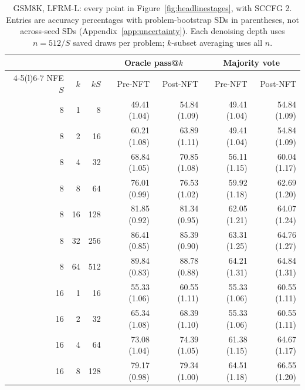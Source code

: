 \documentclass{article}
\begin{document}
\begin{table}[!htbp]
\caption{GSM8K, LFRM-L: every point in Figure~\ref{fig:headlinestages}, with SCCFG 2. Entries are accuracy percentages with problem-bootstrap SDs in parentheses, not across-seed SDs (Appendix~\ref{app:uncertainty}). Each denoising depth uses $n=512/S$ saved draws per problem; $k$-subset averaging uses all $n$.}
\label{tab:budgetvaluesgsml}
\centering\small
\setlength{\tabcolsep}{5pt}
\begin{tabular}{@{}rrr rrrr@{}}
\toprule
& & & \multicolumn{2}{c}{Oracle pass@$k$} & \multicolumn{2}{c}{Majority vote} \\
\cmidrule(lr){4-5}\cmidrule(l){6-7}
NFE $S$ & $k$ & $kS$ & Pre-NFT & Post-NFT & Pre-NFT & Post-NFT \\
\midrule
8 & 1 & 8 & 49.41 {\scriptsize (1.04)} & 54.84 {\scriptsize (1.09)} & 49.41 {\scriptsize (1.04)} & 54.84 {\scriptsize (1.09)} \\
8 & 2 & 16 & 60.21 {\scriptsize (1.08)} & 63.89 {\scriptsize (1.11)} & 49.41 {\scriptsize (1.04)} & 54.84 {\scriptsize (1.09)} \\
8 & 4 & 32 & 68.84 {\scriptsize (1.05)} & 70.85 {\scriptsize (1.08)} & 56.11 {\scriptsize (1.15)} & 60.04 {\scriptsize (1.17)} \\
8 & 8 & 64 & 76.01 {\scriptsize (0.99)} & 76.53 {\scriptsize (1.02)} & 59.92 {\scriptsize (1.18)} & 62.69 {\scriptsize (1.20)} \\
8 & 16 & 128 & 81.85 {\scriptsize (0.92)} & 81.34 {\scriptsize (0.95)} & 62.05 {\scriptsize (1.21)} & 64.07 {\scriptsize (1.24)} \\
8 & 32 & 256 & 86.41 {\scriptsize (0.85)} & 85.39 {\scriptsize (0.90)} & 63.31 {\scriptsize (1.25)} & 64.76 {\scriptsize (1.27)} \\
8 & 64 & 512 & 89.84 {\scriptsize (0.83)} & 88.78 {\scriptsize (0.88)} & 64.21 {\scriptsize (1.31)} & 64.84 {\scriptsize (1.31)} \\
\midrule
16 & 1 & 16 & 55.33 {\scriptsize (1.06)} & 60.55 {\scriptsize (1.11)} & 55.33 {\scriptsize (1.06)} & 60.55 {\scriptsize (1.11)} \\
16 & 2 & 32 & 65.34 {\scriptsize (1.08)} & 68.39 {\scriptsize (1.10)} & 55.33 {\scriptsize (1.06)} & 60.55 {\scriptsize (1.11)} \\
16 & 4 & 64 & 73.08 {\scriptsize (1.04)} & 74.39 {\scriptsize (1.05)} & 61.38 {\scriptsize (1.15)} & 64.67 {\scriptsize (1.17)} \\
16 & 8 & 128 & 79.17 {\scriptsize (0.98)} & 79.34 {\scriptsize (1.00)} & 64.51 {\scriptsize (1.18)} & 66.55 {\scriptsize (1.20)} \\

\end{tabular}
\end{table}
\end{document}
